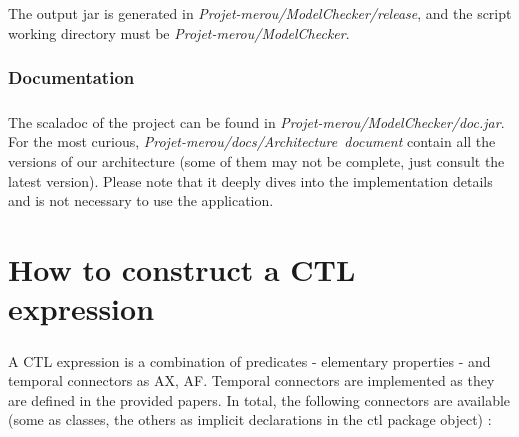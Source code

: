 \documentclass{report}
\begin{document}
\paragraph{}
\hspace{4mm}The output jar is generated in \textit{Projet-merou/ModelChecker/release}, and the script working directory must be \textit{Projet-merou/ModelChecker}.

\subsection{Documentation}

\paragraph{}
\hspace{4mm}The scaladoc of the project can be found in \textit{Projet-merou/ModelChecker/doc.jar}. For the most curious,
\textit{Projet-merou/docs/Architecture\ document} contain all the versions of our architecture (some of them may not be complete, just consult the latest version).
Please note that it deeply dives into the implementation details and is not necessary to use the application.

\chapter{How to construct a CTL expression}

\paragraph{}
\hspace{4mm}A CTL expression is a combination of predicates - elementary properties - and temporal connectors as AX, AF.
    Temporal connectors are implemented as they are defined in the provided papers. In total, the following connectors are available
(some as classes, the others as implicit declarations in the ctl package object) :
\end{document}
